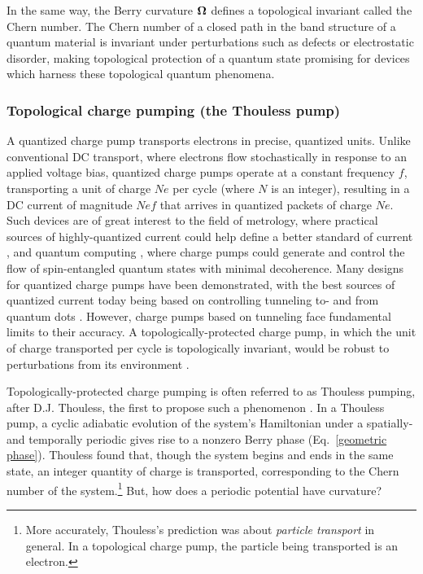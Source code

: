\documentclass[double,12pt,1in,seploa]{beavtex}
\let\Oldsubsubsection\subsubsection
\renewcommand{\subsubsection}{\FloatBarrier\Oldsubsubsection}
\begin{document}
In the same way, the Berry curvature $\vectorbold{\Omega}$ defines a topological invariant called the Chern number. The Chern number of a closed path in the band structure of a quantum material is invariant under perturbations such as defects or electrostatic disorder, making topological protection of a quantum state promising for devices which harness these topological quantum phenomena. 

\subsubsection{Topological charge pumping (the Thouless pump)}

A quantized charge pump transports electrons in precise, quantized units. Unlike conventional DC transport, where electrons flow stochastically in response to an applied voltage bias, quantized charge pumps operate at a constant frequency $f$, transporting a unit of charge $Ne$ per cycle (where $N$ is an integer), resulting in a DC current of magnitude $Nef$ that arrives in quantized packets of charge $Ne$. Such devices are of great interest to the field of metrology, where practical sources of highly-quantized current could help define a better standard of current \cite{pekola_single-electron_2013,scherer_singleelectron_2019}, and quantum computing \cite{das_controlled_2006}, where charge pumps could generate and control the flow of spin-entangled quantum states with minimal decoherence. Many designs for quantized charge pumps have been demonstrated, with the best sources of quantized current today being based on controlling tunneling to- and from quantum dots \cite{scherer_singleelectron_2019}. However, charge pumps based on tunneling face fundamental limits to their accuracy. A topologically-protected charge pump, in which the unit of charge transported per cycle is topologically invariant, would be robust to perturbations from its environment \cite{niu_towards_1990}. 

Topologically-protected charge pumping is often referred to as Thouless pumping, after D.J. Thouless, the first to propose such a phenomenon \cite{thouless_quantization_1983}. In a Thouless pump, a cyclic adiabatic evolution of the system's Hamiltonian under a spatially- and temporally periodic gives rise to a nonzero Berry phase (Eq.\ \ref{geometric phase}). Thouless found that, though the system begins and ends in the same state, an integer quantity of charge is transported, corresponding to the Chern number of the system.\footnote{More accurately, Thouless's prediction was about \textit{particle transport} in general. In a topological charge pump, the particle being transported is an electron.} But, how does a periodic potential have curvature?  
\end{document}
